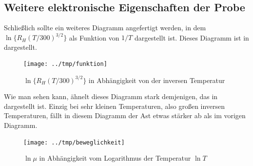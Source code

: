 \subsection{Weitere elektronische Eigenschaften der Probe}

Schließlich sollte ein weiteres Diagramm angefertigt werden, in dem
$\ln\{R_H(T/300)^{3/2}\}$ als Funktion von $1/T$ dargestellt ist. Dieses
Diagramm ist in  dargestellt.

\begin{figure}[htb]
   \centering
   \texttt{[image: ../tmp/funktion]}
   \caption{$\ln\{R_H(T/300)^{3/2}\}$ in Abhängigkeit von der inversen
   Temperatur}
   \label{fig:funktion}
\end{figure}

Wie man sehen kann, ähnelt dieses Diagramm stark demjenigen, das in
 dargestellt ist. Einzig bei sehr kleinen Temperaturen,
also großen inversen Temperaturen, fällt in diesem Diagramm der Ast etwas
stärker ab als im vorigen Diagramm.

\begin{figure}[htb]
   \centering
   \texttt{[image: ../tmp/beweglichkeit]}
   \caption{$\ln μ$ in Abhängigkeit vom Logarithmus der Temperatur $\ln T$}
   \label{fig:beweglichkeit}
\end{figure}
